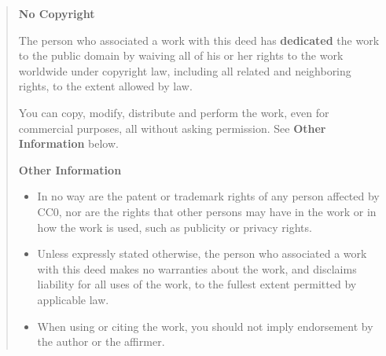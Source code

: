 \begin{quotation}
    \sffamily

    \noindent \textbf{\large No Copyright}

    \vspace{1.5ex}

    The person who associated a work with this deed has \textbf{dedicated} the work to the public domain by waiving all of his or her rights to the work worldwide under copyright law, including all related and neighboring rights, to the extent allowed by law.

    You can copy, modify, distribute and perform the work, even for commercial purposes, all without asking permission. See \textbf{Other Information} below.

    \vspace{1.5ex}

    \noindent \textbf{\large Other Information}

    \vspace{1.5ex}

    \vspace{-\topsep}

    \begin{itemize}
        \item In no way are the patent or trademark rights of any person affected by CC0, nor are the rights that other persons may have in the work or in how the work is used, such as publicity or privacy rights.
        \item Unless expressly stated otherwise, the person who associated a work with this deed makes no warranties about the work, and disclaims liability for all uses of the work, to the fullest extent permitted by applicable law.
        \item When using or citing the work, you should not imply endorsement by the author or the affirmer.
    \end{itemize}
\end{quotation}
